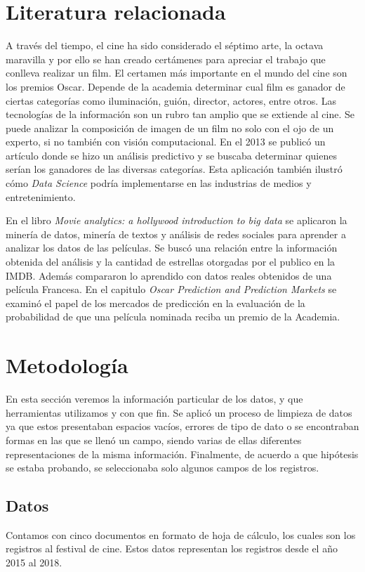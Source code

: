 \documentclass[5p,times]{elsarticle}
\begin{document}
\section*{Literatura relacionada}
A través del tiempo, el cine ha sido considerado el séptimo arte, la octava maravilla y por ello se han creado certámenes para apreciar el trabajo que conlleva realizar un film. El certamen más importante en el mundo del cine son los premios Oscar. Depende de la academia determinar cual film es ganador de ciertas categorías como iluminación, guión, director, actores, entre otros. Las tecnologías de la información son un rubro tan amplio que se extiende al cine. Se puede analizar la composición de imagen de un film no solo con el ojo de un experto, si no también con visión computacional. En el 2013 se publicó un artículo \cite{oscars2013} donde se hizo un análisis predictivo y se buscaba determinar quienes serían los ganadores de las diversas categorías. Esta aplicación también ilustró cómo \textit{Data Science} podría implementarse en las industrias de medios y entretenimiento.

En el libro \textit{Movie analytics: a hollywood introduction to big data} \cite{movie2015} se aplicaron la minería de datos, minería de textos y análisis de redes sociales para aprender a analizar los datos de las películas. Se buscó una relación entre la información obtenida del análisis y la cantidad de estrellas otorgadas por el publico en la IMDB. Además compararon lo aprendido con datos reales obtenidos de una película Francesa. En el capitulo \textit{Oscar Prediction and Prediction Markets} \cite{inbook} se examinó el papel de los mercados de predicción en la evaluación de la probabilidad de que una película nominada reciba un premio de la Academia.

\section*{Metodología}
En esta sección veremos la información particular de los datos, y que herramientas utilizamos y con que fin. Se aplicó un proceso de limpieza de datos ya que estos presentaban espacios vacíos, errores de tipo de dato o se encontraban formas en las que se llenó un campo, siendo varias de ellas diferentes representaciones de la misma información. Finalmente, de acuerdo a que hipótesis se estaba probando, se seleccionaba solo algunos campos de los registros.


\subsection*{Datos}
Contamos con cinco documentos en formato de hoja de cálculo, los cuales son los registros al festival de cine. Estos datos representan los registros desde el año 2015 al 2018.
\end{document}
